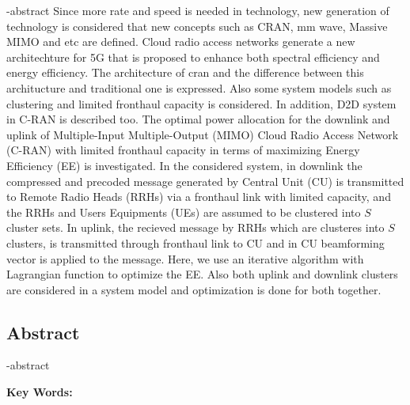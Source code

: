 
\en-abstract{
Since more rate and speed is needed in technology, new generation of technology is considered that new concepts such as CRAN, mm wave, Massive MIMO and etc are defined. 
Cloud radio access networks generate a new architechture for 5G that is proposed to enhance both spectral efficiency and energy efficiency. 
The architecture of cran and the difference between this architucture and traditional one is expressed.
Also some system models such as clustering and limited fronthaul capacity is considered. In addition, D2D system in C-RAN is described too.
The optimal power allocation for the downlink and uplink of Multiple-Input Multiple-Output (MIMO) Cloud Radio Access Network (C-RAN) with limited fronthaul capacity in terms of maximizing Energy Efficiency (EE) is investigated. 
In the considered system, in downlink the compressed and precoded message generated by Central Unit (CU) is transmitted to Remote Radio Heads (RRHs) via a fronthaul link with limited capacity, and the RRHs and Users Equipments (UEs) are assumed to be clustered into $S$ cluster sets.
In uplink, the recieved message by RRHs which are clusteres into $S$ clusters, is transmitted through fronthaul link to CU and in CU beamforming vector is applied to the message.
Here, we use an iterative algorithm with Lagrangian function to optimize the EE.
Also both uplink and downlink clusters are considered in a system model and optimization is done for both together.
}

\newpage
\thispagestyle{empty}
\begin{latin}
\section*{\LARGE\centering Abstract}

\een-abstract

\vspace*{.5cm}
{\large\textbf{Key Words:}}\par
\vspace*{.5cm}
\elatinkeywords
\end{latin}